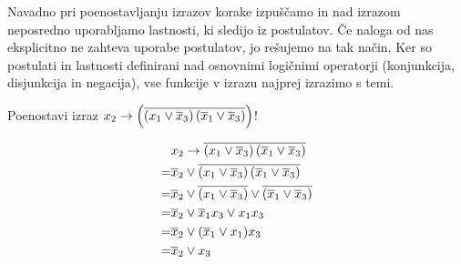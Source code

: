 Navadno pri poenostavljanju izrazov korake izpuščamo in nad izrazom neposredno uporabljamo lastnosti, ki sledijo iz postulatov. Če naloga od nas eksplicitno ne zahteva uporabe postulatov, jo rešujemo na tak način. Ker so postulati in lastnosti definirani nad osnovnimi logičnimi operatorji (konjunkcija, disjunkcija in negacija), vse funkcije v izrazu najprej izrazimo s temi.

\begin{zgled}
Poenostavi izraz $x_2 \rightarrow \left( \overline{\left( x_1 \vee \overline x_3 \right) \left( \overline x_1 \vee \overline x_3\right)}\right)$!
\end{zgled}
\begin{resitev}
\begin{align*}
&  x_2 \rightarrow \overline{\left( x_1 \vee \overline x_3 \right) \left( \overline x_1 \vee \overline x_3\right)}\\
 = & \overline x_2 \vee \overline{\left( x_1 \vee \overline x_3 \right) \left( \overline x_1 \vee \overline x_3\right)}\\
 = & \overline x_2 \vee \overline{\left( x_1 \vee \overline x_3 \right)} \vee \overline{\left( \overline x_1 \vee \overline x_3\right)}\\
 = & \overline x_2 \vee \overline x_1 x_3 \vee x_1 x_3\\
 = & \overline x_2 \vee (\overline x_1 \vee x_1) x_3\\
 = & \overline x_2 \vee x_3
\end{align*}
\end{resitev}







